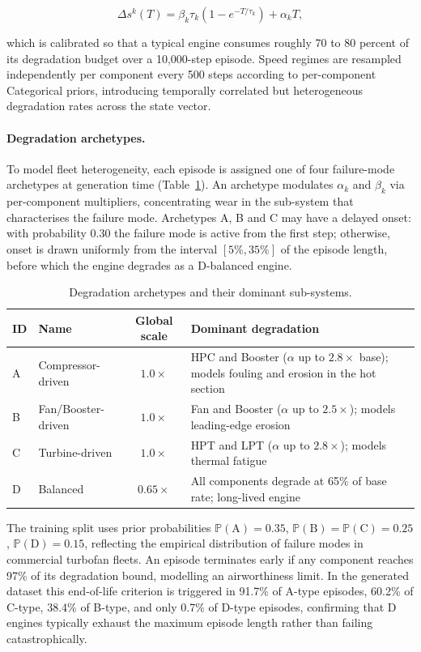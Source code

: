 \begin{equation}
  \Delta s^k(T) = \beta_k \tau_k \!\left(1 - e^{-T/\tau_k}\right) + \alpha_k T,
\end{equation}

which is calibrated so that a typical engine consumes roughly 70 to 80
percent of its degradation budget over a 10{,}000-step episode.
Speed regimes are resampled independently per component every 500 steps
according to per-component Categorical priors, introducing temporally
correlated but heterogeneous degradation rates across the state vector.

\paragraph{Degradation archetypes.}
To model fleet heterogeneity, each episode is assigned one of four
failure-mode archetypes at generation time
(Table~\ref{tab:archetypes}). An archetype modulates $\alpha_k$ and
$\beta_k$ via per-component multipliers, concentrating wear in the
sub-system that characterises the failure mode.
Archetypes A, B and C may have a delayed onset: with probability 0.30
the failure mode is active from the first step; otherwise, onset is
drawn uniformly from the interval $[5\%, 35\%]$ of the episode length,
before which the engine degrades as a D-balanced engine.

\begin{table}[h]
\centering
\caption{Degradation archetypes and their dominant sub-systems.}
\label{tab:archetypes}
\small
\begin{tabular}{llcp{5.5cm}}
\toprule
ID & Name & Global scale & Dominant degradation \\
\midrule
A & Compressor-driven & $1.0\times$ &
    HPC and Booster ($\alpha$ up to $2.8\times$ base); models fouling and
    erosion in the hot section \\
B & Fan/Booster-driven & $1.0\times$ &
    Fan and Booster ($\alpha$ up to $2.5\times$); models leading-edge erosion \\
C & Turbine-driven    & $1.0\times$ &
    HPT and LPT ($\alpha$ up to $2.8\times$); models thermal fatigue \\
D & Balanced          & $0.65\times$ &
    All components degrade at 65\% of base rate; long-lived engine \\
\bottomrule
\end{tabular}
\end{table}

The training split uses prior probabilities
$\mathbb{P}(\text{A}) = 0.35$,
$\mathbb{P}(\text{B}) = \mathbb{P}(\text{C}) = 0.25$,
$\mathbb{P}(\text{D}) = 0.15$,
reflecting the empirical distribution of failure modes in commercial
turbofan fleets. An episode terminates early if any component reaches
97\% of its degradation bound, modelling an airworthiness limit.
In the generated dataset this end-of-life criterion is triggered in
91.7\% of A-type episodes, 60.2\% of C-type, 38.4\% of B-type, and
only 0.7\% of D-type episodes, confirming that D engines typically
exhaust the maximum episode length rather than failing catastrophically.

